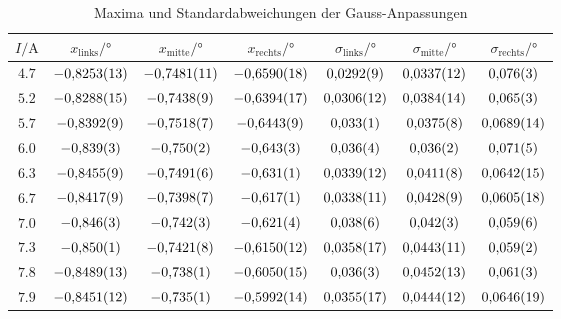\begin{table}[htbp]
   \centering
\caption{Maxima und Standardabweichungen der Gauss-Anpassungen}
\begin{tabular}{c c c c c c c}
\hline$I / \unit{\ampere}$ & $x_\mathrm{links} / \unit{\degree}$ & $x_\mathrm{mitte} / \unit{\degree}$ & $x_\mathrm{rechts} / \unit{\degree}$ & $\sigma_\mathrm{links} / \unit{\degree}$ & $\sigma_\mathrm{mitte} / \unit{\degree}$ & $\sigma_\mathrm{rechts} / \unit{\degree}$ \\ 
\hline
$\num{4.7}$ & $\num{-0.8253\pm 0.0013}$ & $\num{-0.7481\pm 0.0011}$ & $\num{-0.6590\pm 0.0018}$ & $\num{0.0292\pm 0.0009}$ & $\num{0.0337\pm 0.0012}$ & $\num{0.076\pm 0.003}$ \\
$\num{5.2}$ & $\num{-0.8288\pm 0.0015}$ & $\num{-0.7438\pm 0.0009}$ & $\num{-0.6394\pm 0.0017}$ & $\num{0.0306\pm 0.0012}$ & $\num{0.0384\pm 0.0014}$ & $\num{0.065\pm 0.003}$ \\
$\num{5.7}$ & $\num{-0.8392\pm 0.0009}$ & $\num{-0.7518\pm 0.0007}$ & $\num{-0.6443\pm 0.0009}$ & $\num{0.033\pm 0.001}$ & $\num{0.0375\pm 0.0008}$ & $\num{0.0689\pm 0.0014}$ \\
$\num{6.0}$ & $\num{-0.839\pm 0.003}$ & $\num{-0.750\pm 0.002}$ & $\num{-0.643\pm 0.003}$ & $\num{0.036\pm 0.004}$ & $\num{0.036\pm 0.002}$ & $\num{0.071\pm 0.005}$ \\
$\num{6.3}$ & $\num{-0.8455\pm 0.0009}$ & $\num{-0.7491\pm 0.0006}$ & $\num{-0.631\pm 0.001}$ & $\num{0.0339\pm 0.0012}$ & $\num{0.0411\pm 0.0008}$ & $\num{0.0642\pm 0.0015}$ \\
$\num{6.7}$ & $\num{-0.8417\pm 0.0009}$ & $\num{-0.7398\pm 0.0007}$ & $\num{-0.617\pm 0.001}$ & $\num{0.0338\pm 0.0011}$ & $\num{0.0428\pm 0.0009}$ & $\num{0.0605\pm 0.0018}$ \\
$\num{7.0}$ & $\num{-0.846\pm 0.003}$ & $\num{-0.742\pm 0.003}$ & $\num{-0.621\pm 0.004}$ & $\num{0.038\pm 0.006}$ & $\num{0.042\pm 0.003}$ & $\num{0.059\pm 0.006}$ \\
$\num{7.3}$ & $\num{-0.850\pm 0.001}$ & $\num{-0.7421\pm 0.0008}$ & $\num{-0.6150\pm 0.0012}$ & $\num{0.0358\pm 0.0017}$ & $\num{0.0443\pm 0.0011}$ & $\num{0.059\pm 0.002}$ \\
$\num{7.8}$ & $\num{-0.8489\pm 0.0013}$ & $\num{-0.738\pm 0.001}$ & $\num{-0.6050\pm 0.0015}$ & $\num{0.036\pm 0.003}$ & $\num{0.0452\pm 0.0013}$ & $\num{0.061\pm 0.003}$ \\
$\num{7.9}$ & $\num{-0.8451\pm 0.0012}$ & $\num{-0.735\pm 0.001}$ & $\num{-0.5992\pm 0.0014}$ & $\num{0.0355\pm 0.0017}$ & $\num{0.0444\pm 0.0012}$ & $\num{0.0646\pm 0.0019}$ \\
\hline\end{tabular}
\label{tab:gauss_zeeman_maxima_and_std}
\end{table}